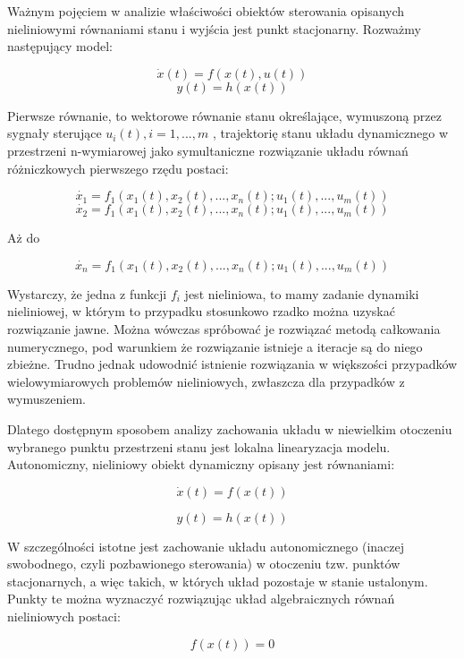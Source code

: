 \documentclass{article}
\begin{document}
	Ważnym pojęciem w analizie właściwości obiektów sterowania opisanych nieliniowymi
	równaniami stanu i wyjścia jest punkt stacjonarny. Rozważmy następujący model:

	\begin{equation}
		\dot{x}(t) = f(x(t), u(t))
	\end{equation}
	\begin{equation}
		y(t) = h(x(t))
	\end{equation}

	Pierwsze równanie, to wektorowe równanie stanu określające, wymuszoną przez
	sygnały sterujące { $ u_i(t), i=1,...,m $ }, trajektorię stanu układu dynamicznego w przestrzeni
	n-wymiarowej jako symultaniczne rozwiązanie układu równań różniczkowych pierwszego rzędu postaci:

	\begin{equation}
		\dot{x_1} = f_1(x_1(t), x_2(t),...,x_n(t); u_1(t),...,u_m(t))
	\end{equation}
	\begin{equation}
		\dot{x_2} = f_1(x_1(t), x_2(t),...,x_n(t); u_1(t),...,u_m(t))
	\end{equation}

	Aż do

	\begin{equation}
		\dot{x_n} = f_1(x_1(t), x_2(t),...,x_n(t); u_1(t),...,u_m(t))
	\end{equation}

	Wystarczy, że jedna z funkcji $f_i$ jest nieliniowa, to mamy zadanie dynamiki nieliniowej, w
	którym to przypadku stosunkowo rzadko można uzyskać rozwiązanie jawne. Można
	wówczas spróbować je rozwiązać metodą całkowania numerycznego, pod warunkiem że
	rozwiązanie istnieje a iteracje są do niego zbieżne. Trudno jednak udowodnić istnienie
	rozwiązania w większości przypadków wielowymiarowych problemów nieliniowych,
	zwłaszcza dla przypadków z wymuszeniem.

	Dlatego dostępnym sposobem analizy zachowania układu w niewielkim otoczeniu
	wybranego punktu przestrzeni stanu jest lokalna linearyzacja modelu. Autonomiczny,
	nieliniowy obiekt dynamiczny opisany jest równaniami:

	\begin{equation}
		\dot{x}(t) = f(x(t))
	\end{equation}

	\begin{equation}
		y(t) = h(x(t))
	\end{equation}

	W szczególności istotne jest zachowanie układu autonomicznego (inaczej swobodnego,
	czyli pozbawionego sterowania) w otoczeniu tzw. punktów stacjonarnych, a więc takich,
	w których układ pozostaje w stanie ustalonym. Punkty te można wyznaczyć rozwiązując
	układ algebraicznych równań nieliniowych postaci:
	
	\begin{equation}
		f(x(t)) = 0
	\end{equation}
\end{document}

